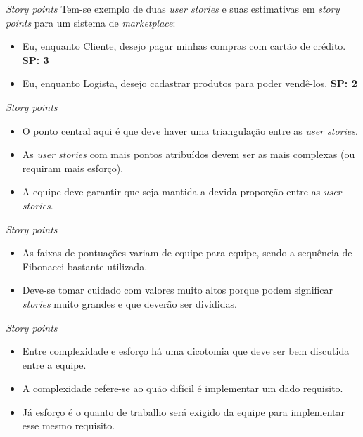 \documentclass[11pt]{beamer}
\begin{document}
    \begin{frame}{\textit{Story points}}
        Tem-se exemplo de duas \textit{user stories} e suas estimativas em \textit{story points} para um sistema de \textit{marketplace}:
        \begin{itemize}
            \item Eu, enquanto Cliente, desejo pagar minhas compras com cartão de crédito. \textbf{SP: 3} 
            \item Eu, enquanto Logista, desejo cadastrar produtos para poder vendê-los. \textbf{SP: 2}
        \end{itemize}
    \end{frame}

    \begin{frame}{\textit{Story points}}
        \begin{itemize}
            \item O ponto central aqui é que deve haver uma triangulação entre as \textit{user stories}.
            \item As \textit{user stories} com mais pontos atribuídos devem ser as mais complexas (ou requiram mais esforço).
            \item A equipe deve garantir que seja mantida a devida proporção entre as \textit{user stories}.
        \end{itemize}
    \end{frame}

    \begin{frame}{\textit{Story points}}
        \begin{itemize}
            \item As faixas de pontuações variam de equipe para equipe, sendo a sequência de Fibonacci bastante utilizada.
            \item Deve-se tomar cuidado com valores muito altos porque podem significar \textit{stories} muito grandes e que deverão ser divididas.
        \end{itemize}
    \end{frame}

    \begin{frame}{\textit{Story points}}
        \begin{itemize}
            \item Entre complexidade e esforço há uma dicotomia que deve ser bem discutida entre a equipe.
            \item A complexidade refere-se ao quão difícil é implementar um dado requisito.
            \item Já esforço é o quanto de trabalho será exigido da equipe para implementar esse mesmo requisito.
        \end{itemize}
    \end{frame}
\end{document}
